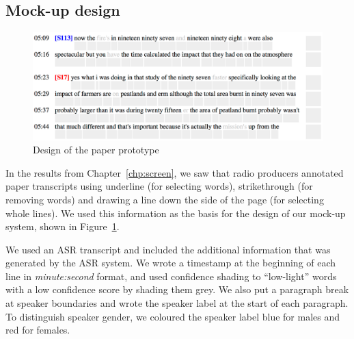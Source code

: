 
\subsection{Mock-up design}

\begin{figure}[h]
  \centering
  \includegraphics[width=\columnwidth]{figs/paper-prototype-design}
  \caption{Design of the paper prototype}
  \label{fig:paper-prototype-design}
\end{figure}

In the results from Chapter~\ref{chp:screen}, we saw that radio producers annotated paper transcripts using underline
(for selecting words), strikethrough (for removing words) and drawing a line down the side of the page (for selecting
whole lines).  We used this information as the basis for the design of our mock-up system, shown in
Figure~\ref{fig:paper-prototype-design}.

We used an ASR transcript and included the additional information that was generated by the ASR system.  We wrote a
timestamp at the beginning of each line in \textit{minute:second} format, and used confidence shading \citep{Vemuri2004}
to ``low-light'' words with a low confidence score by shading them grey. We also put a paragraph break at speaker
boundaries and wrote the speaker label at the start of each paragraph. To distinguish speaker gender, we coloured the
speaker label blue for males and red for females.

